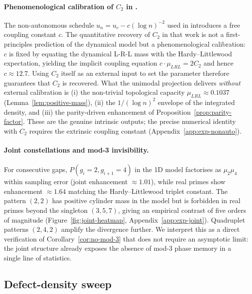 \paragraph{Phenomenological calibration of $C_2$ in
\cite{wang2026emergence}.}
The non-autonomous schedule $u_n = u_c - c (\log n)^{-2}$ used in
\cite{wang2026emergence} introduces a free coupling constant $c$. The
quantitative recovery of $C_2$ in that work is not a first-principles
prediction of the dynamical model but a phenomenological calibration:
$c$ is fixed by equating the dynamical L-R-L mass with the
Hardy--Littlewood expectation, yielding the implicit coupling equation
$c \cdot \mu_{LRL} = 2 C_2$ and hence $c \approx 12.7$. Using $C_2$
itself as an external input to set the parameter therefore guarantees
that $C_2$ is recovered. What the unimodal projection delivers
\emph{without} external calibration is (i) the non-trivial topological
capacity $\mu_{LRL} \approx 0.1037$ (Lemma~\ref{lem:positive-mass}),
(ii) the $1/(\log n)^2$ envelope of the integrated density, and
(iii) the parity-driven enhancement of Proposition~\ref{prop:parity-factor}.
These are the genuine intrinsic outputs; the precise numerical
identity with $C_2$ requires the extrinsic coupling constant
(Appendix~\ref{app:exp-nonauto}).

\paragraph{Joint constellations and mod-3 invisibility.} For consecutive
gaps, $P(g_i = 2, g_{i+1} = 4)$ in the 1D model factorises as
$\mu_2 \mu_4$ within sampling error (joint enhancement
$\approx 1.01$), while real primes show enhancement $\approx 1.64$
matching the Hardy--Littlewood triplet constant. The pattern $(2, 2)$
has positive cylinder mass in the model but is forbidden in real primes
beyond the singleton $(3, 5, 7)$, giving an empirical contrast of five
orders of magnitude (Figure~\ref{fig:joint-heatmap},
Appendix~\ref{app:exp-joint}). Quadruplet patterns
$(2, 4, 2)$ amplify the divergence further. We interpret this as a
direct verification of Corollary~\ref{cor:no-mod-3} that does not
require an asymptotic limit: the joint structure already exposes the
absence of mod-$3$ phase memory in a single line of statistics.

\subsection{Defect-density sweep}
\label{app:exp-defects}

